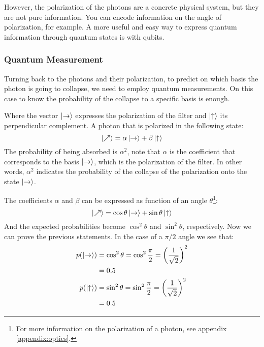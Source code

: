 However, the polarization of the photons are a concrete physical system, but they are not pure information. You can encode information on the angle of polarization, for example. A more useful and easy way to express quantum information through quantum states is with qubits. 

\subsubsection{Quantum Measurement}
Turning back to the photons and their polarization, to predict on which basis the photon is going to collapse, we need to employ quantum measurements. On this case to know the probability of the collapse to a specific basis is enough. 

Where the vector $\ket{\text{\textrightarrow}}$ expresses the polarization of the filter and $\ket{\text{\textuparrow}}$ its perpendicular complement. A photon that is polarized in the following state:
$$
\ket{\nearrow} = \alpha\ket{\text{\textrightarrow}} + \beta\ket{\text{\textuparrow}}
$$
The probability of being absorbed is $\alpha^2$, note that $\alpha$ is the coefficient that corresponds to the basis $\ket{\text{\textrightarrow}}$, which is the polarization of the filter. In other words, $\alpha^2$ indicates the probability of the collapse of the polarization onto the state $\ket{\text{\textrightarrow}}$. 

The coefficients $\alpha$ and $\beta$ can be expressed as function of an angle $\theta$\footnote{For more information on the polarization of a photon, see appendix \ref{appendix:optics}.}:
\begin{equation}
	\ket{\nearrow} = \cos\theta\ket{\text{\textrightarrow}} + \sin\theta\ket{\text{\textuparrow}}
	\label{eq:photon_state}
\end{equation}
And the expected probabilities become $\cos^2\theta$ and  $\sin^2\theta$, respectively. Now we can prove the previous statements. In the case of a $\pi/2$ angle we see that:
\begin{align*}
	p(\ket{\text{\textrightarrow}}) &= \cos^2\theta 
	= \cos^2 \frac{\pi}{2}
	= \left( \frac{1}{\sqrt{2}} \right) ^2 \\
	&= 0.5 \\
	p(\ket{\text{\textuparrow}}) &= \sin^2\theta 
	= \sin^2 \frac{\pi}{2}
	= \left( \frac{1}{\sqrt{2}} \right) ^2 \\
	&= 0.5 \\	
\end{align*} 
